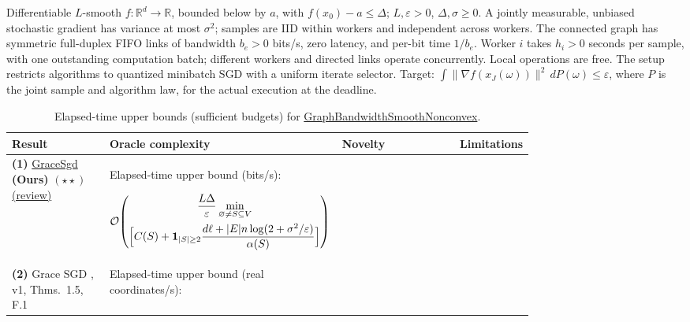 \begin{table}[tp]
\centering
\caption{Elapsed-time upper bounds (sufficient budgets) for \href{https://github.com/k3nfalt/longtails/blob/main/LongTails/Setups/GraphBandwidthSmoothNonconvex.lean}{GraphBandwidthSmoothNonconvex}.}\label{tab:GraphBandwidthSmoothNonconvex}
\parbox{\linewidth}{\footnotesize Differentiable $L$-smooth $f:\mathbb R^d\to\mathbb R$, bounded below by $a$, with $f(x_0)-a\le\Delta$; $L,\varepsilon>0$, $\Delta,\sigma\ge0$. A jointly measurable, unbiased stochastic gradient has variance at most $\sigma^2$; samples are IID within workers and independent across workers. The connected graph has symmetric full-duplex FIFO links of bandwidth $b_e>0$ bits/s, zero latency, and per-bit time $1/b_e$. Worker $i$ takes $h_i>0$ seconds per sample, with one outstanding computation batch; different workers and directed links operate concurrently. Local operations are free. The setup restricts algorithms to quantized minibatch SGD with a uniform iterate selector. Target: $\int\|\nabla f(x_J(\omega))\|^2\,dP(\omega)\le\varepsilon$, where $P$ is the joint sample and algorithm law, for the actual execution at the deadline.}\par\smallskip
\begin{threeparttable}
\footnotesize
\setlength{\tabcolsep}{4pt}\renewcommand{\arraystretch}{1.25}
\begin{tabularx}{\linewidth}{@{}>{\raggedright\arraybackslash}p{0.20\linewidth}>{\raggedright\arraybackslash}p{0.32\linewidth}>{\raggedright\arraybackslash}p{0.25\linewidth}>{\raggedright\arraybackslash}X@{}}
\toprule
\textbf{Result} & \textbf{Oracle complexity} & \textbf{Novelty} & \textbf{Limitations} \\
\midrule
\textbf{(1)} \href{https://github.com/k3nfalt/longtails/blob/main/LongTails/Theorems/GraceSgd.lean}{Grace\allowbreak Sgd} \textbf{(Ours)} $(\star\star)$ \href{https://github.com/k3nfalt/longtails/blob/main/scripts/reviews/GraceSgd.md}{(review)}
& Elapsed-time upper bound (bits/s):\par
$\displaystyle\mathcal{O}\!\left(\begin{gathered}
\frac{L\Delta}{\varepsilon}\min_{\varnothing\ne S\subseteq V}\\
\Bigl[C(S)+\mathbf1_{|S|\ge2}\frac{d\ell+|E|n\log(2+\sigma^2/\varepsilon)}{\alpha(S)}\Bigr]
\end{gathered}\right)$
& & \\
\midrule[1.2pt]
\textbf{(2)} Grace SGD \citep{bhTyurinLeonV1}, v1, Thms.~1.5, F.1
& Elapsed-time upper bound (real coordinates/s):\par

\end{tabularx}
\end{threeparttable}
\end{table}
